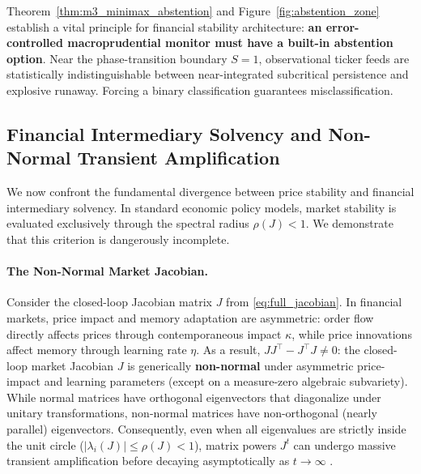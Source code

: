 \documentclass[12pt]{article}
\theoremstyle{definition}
\theoremstyle{remark}
\begin{document}
Theorem~\ref{thm:m3_minimax_abstention} and Figure~\ref{fig:abstention_zone} establish a vital principle for financial stability architecture: \textbf{an error-controlled macroprudential monitor must have a built-in abstention option}. Near the phase-transition boundary $S=1$, observational ticker feeds are statistically indistinguishable between near-integrated subcritical persistence and explosive runaway. Forcing a binary classification guarantees misclassification.

\subsection{Financial Intermediary Solvency and Non-Normal Transient Amplification}
We now confront the fundamental divergence between price stability and financial intermediary solvency. In standard economic policy models, market stability is evaluated exclusively through the spectral radius $\rho(J) < 1$. We demonstrate that this criterion is dangerously incomplete.

\paragraph{The Non-Normal Market Jacobian.}
Consider the closed-loop Jacobian matrix $J$ from \eqref{eq:full_jacobian}. In financial markets, price impact and memory adaptation are asymmetric: order flow directly affects prices through contemporaneous impact $\kappa$, while price innovations affect memory through learning rate $\eta$. As a result, $J J^\top - J^\top J \neq 0$: the closed-loop market Jacobian $J$ is generically \textbf{non-normal} under asymmetric price-impact and learning parameters (except on a measure-zero algebraic subvariety). While normal matrices have orthogonal eigenvectors that diagonalize under unitary transformations, non-normal matrices have non-orthogonal (nearly parallel) eigenvectors. Consequently, even when all eigenvalues are strictly inside the unit circle ($|\lambda_i(J)| \le \rho(J) < 1$), matrix powers $J^t$ can undergo massive transient amplification before decaying asymptotically as $t \to \infty$ \citep{trefethen2005spectra}.
\end{document}
